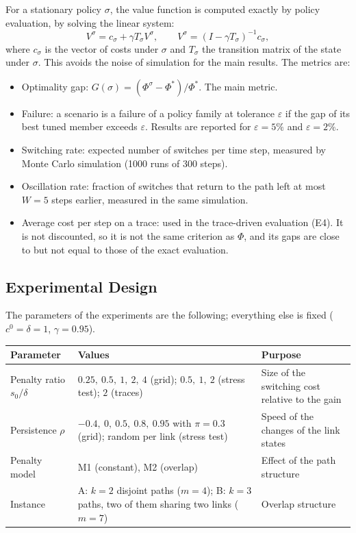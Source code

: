 For a stationary policy $\sigma$, the value function is computed exactly by policy evaluation, by solving the linear system:
\begin{equation}
  V^{\sigma} = c_{\sigma} + \gamma T_{\sigma} V^{\sigma}, \qquad
  V^{\sigma} = (I - \gamma T_{\sigma})^{-1} c_{\sigma},
  \label{eq:policyeval}
\end{equation}
where $c_\sigma$ is the vector of costs under $\sigma$ and $T_\sigma$ the transition matrix of the state under $\sigma$. This avoids the noise of simulation for the main results. The metrics are:
\begin{itemize}
  \item Optimality gap: $G(\sigma) = (\Phi^{\sigma} - \Phi^*)/\Phi^*$. The main metric.
  \item Failure: a scenario is a failure of a policy family at tolerance $\varepsilon$ if the gap of its best tuned member exceeds $\varepsilon$. Results are reported for $\varepsilon = 5\%$ and $\varepsilon = 2\%$.
  \item Switching rate: expected number of switches per time step, measured by Monte Carlo simulation (1000 runs of 300 steps).
  \item Oscillation rate: fraction of switches that return to the path left at most $W = 5$ steps earlier, measured in the same simulation.
  \item Average cost per step on a trace: used in the trace-driven evaluation (E4). It is not discounted, so it is not the same criterion as $\Phi$, and its gaps are close to but not equal to those of the exact evaluation.
\end{itemize}

\subsection{Experimental Design}

The parameters of the experiments are the following; everything else is fixed ($c^0 = \delta = 1$, $\gamma = 0.95$).

\begin{table}[ht]
  \centering
  \footnotesize
  \begin{tabular}{@{}>{\raggedright\arraybackslash}p{}>{\raggedright\arraybackslash}p{}>{\raggedright\arraybackslash}p{}@{}}
    \toprule
    Parameter & Values & Purpose \\
    \midrule
    Penalty ratio $s_0/\delta$ & $0.25,\ 0.5,\ 1,\ 2,\ 4$ (grid); $0.5,\ 1,\ 2$ (stress test); $2$ (traces) & Size of the switching cost relative to the gain \\
    Persistence $\rho$ & $-0.4,\ 0,\ 0.5,\ 0.8,\ 0.95$ with $\pi = 0.3$ (grid); random per link (stress test) & Speed of the changes of the link states \\
    Penalty model & M1 (constant), M2 (overlap) & Effect of the path structure \\
    Instance & A: $k = 2$ disjoint paths ($m = 4$); B: $k = 3$ paths, two of them sharing two links ($m = 7$) & Overlap structure \\
    \bottomrule
  \end{tabular}
\end{table}


